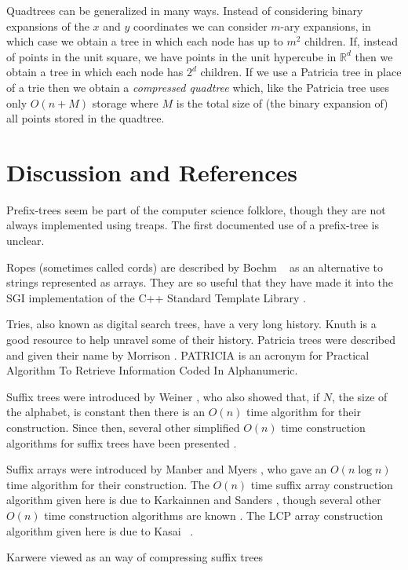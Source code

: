 Quadtrees can be generalized in many ways.  Instead of considering
binary expansions of the $x$ and $y$ coordinates we can consider
$m$-ary expansions, in which case we obtain a tree in which each node
has up to $m^2$ children.  If, instead of points in the unit square,
we have points in the unit hypercube in $\mathbb{R}^d$ then we obtain
a tree in which each node has $2^d$ children.  If we use a Patricia
tree in place of a trie then we obtain a \emph{compressed quadtree}
which, like the Patricia tree uses only $O(n+M)$ storage where $M$ is
the total size of (the binary expansion of) all points stored in the
quadtree.

\section{Discussion and References}

Prefix-trees seem be part of the computer science folklore, though
they are not always implemented using treaps. The first documented use
of a prefix-tree is unclear.

Ropes (sometimes called cords) are described by Boehm \etal\ \cite{bap95}
as an alternative to strings represented as arrays.  They are so useful
that they have made it into the SGI implementation of the C++ Standard
Template Library \cite{x}.

Tries, also known as digital search trees, have a very long history.
Knuth \cite{k73c} is a good resource to help unravel some of their
history.  Patricia trees were described and given their name by
Morrison \cite{m68}.  PATRICIA is an acronym for Practical Algorithm
To Retrieve Information Coded In Alphanumeric.

Suffix trees were introduced by Weiner \cite{w73}, who also showed
that, if $N$, the size of the alphabet, is constant then there is an
$O(n)$ time algorithm for their construction.  Since then, several
other simplified $O(n)$ time construction algorithms for suffix trees
have been presented \cite{cs85,m76,f97}.

Suffix arrays were introduced by Manber and Myers \cite{S}, who gave an
$O(n\log n)$ time algorithm for their construction.  The $O(n)$ time
suffix array construction algorithm given here is due to Karkainnen
and Sanders \cite{x}, though several other $O(n)$ time construction
algorithms are known \cite{S}.  The LCP array construction algorithm
given here is due to Kasai \etal\ \cite{kS}.

Karwere viewed as an way of compressing suffix trees \cite{S}


